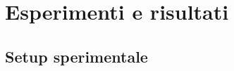 \chapter{Esperimenti e risultati}
\label{ch:risultati}

%
%

%
%


\section{Setup sperimentale}
\label{sec:setup}
%


